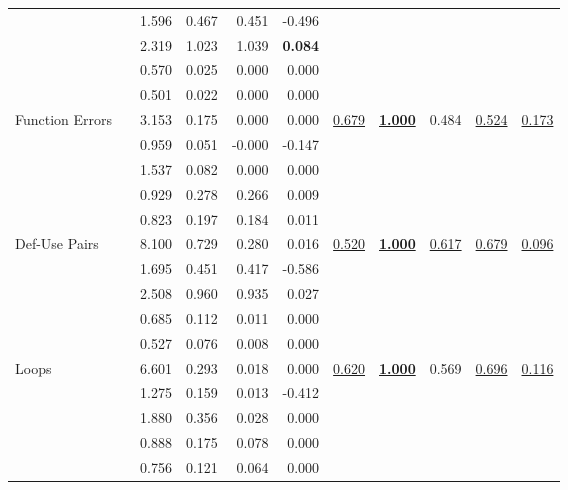\begin{tabular}{llrrrrrrrrr}
     & \NAISHT{} & 1.596 & 0.467 & 0.451 & -0.496 &  &  &  &  & \\
     & \GPOT{} & 2.319 & 1.023 & 1.039 & \textbf{\color{deepblue}0.084} &  &  &  &  & \\[.2em]
\rowcolor{row}
     & \TARANTULA{}\rowstrut{} & 0.570 & 0.025 & 0.000 & 0.000 &  &  &  &  & \\
\rowcolor{row}
     & \OCHIAI{} & 0.501 & 0.022 & 0.000 & 0.000 &  &  &  &  & \\
\rowcolor{row}
    Function Errors & \DSTAR{} & 3.153 & 0.175 & 0.000 & 0.000 & \underline{0.679} & \textbf{\color{deepblue}\underline{1.000}} & 0.484 & \underline{0.524} & \underline{0.173}\\
\rowcolor{row}
     & \NAISHT{} & 0.959 & 0.051 & -0.000 & -0.147 &  &  &  &  & \\
\rowcolor{row}
     & \GPOT{} & 1.537 & 0.082 & 0.000 & 0.000 &  &  &  &  & \\[.2em]
     & \TARANTULA{}\rowstrut{} & 0.929 & 0.278 & 0.266 & 0.009 &  &  &  &  & \\
     & \OCHIAI{} & 0.823 & 0.197 & 0.184 & 0.011 &  &  &  &  & \\
    Def-Use Pairs & \DSTAR{} & 8.100 & 0.729 & 0.280 & 0.016 & \underline{0.520} & \textbf{\color{deepblue}\underline{1.000}} & \underline{0.617} & \underline{0.679} & \underline{0.096}\\
     & \NAISHT{} & 1.695 & 0.451 & 0.417 & -0.586 &  &  &  &  & \\
     & \GPOT{} & 2.508 & 0.960 & 0.935 & 0.027 &  &  &  &  & \\[.2em]
\rowcolor{row}
     & \TARANTULA{}\rowstrut{} & 0.685 & 0.112 & 0.011 & 0.000 &  &  &  &  & \\
\rowcolor{row}
     & \OCHIAI{} & 0.527 & 0.076 & 0.008 & 0.000 &  &  &  &  & \\
\rowcolor{row}
    Loops & \DSTAR{} & 6.601 & 0.293 & 0.018 & 0.000 & \underline{0.620} & \textbf{\color{deepblue}\underline{1.000}} & 0.569 & \underline{0.696} & \underline{0.116}\\
\rowcolor{row}
     & \NAISHT{} & 1.275 & 0.159 & 0.013 & -0.412 &  &  &  &  & \\
\rowcolor{row}
     & \GPOT{} & 1.880 & 0.356 & 0.028 & 0.000 &  &  &  &  & \\[.2em]
     & \TARANTULA{}\rowstrut{} & 0.888 & 0.175 & 0.078 & 0.000 &  &  &  &  & \\
     & \OCHIAI{} & 0.756 & 0.121 & 0.064 & 0.000 &  &  &  &  & \\

\end{tabular}

